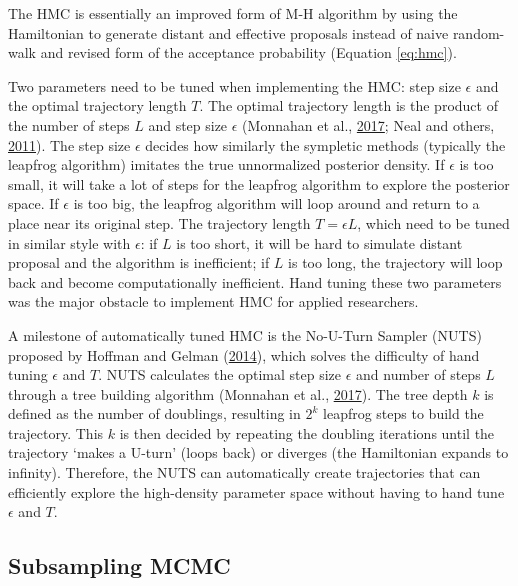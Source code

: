 \documentclass[12pt]{book}
\numberwithin{equation}{chapter}
\begin{document}
The HMC is essentially an improved form of M-H algorithm by using the Hamiltonian to generate distant and effective proposals instead of naive random-walk and revised form of the acceptance probability (Equation \eqref{eq:hmc}).

Two parameters need to be tuned when implementing the HMC: step size \(\epsilon\) and the optimal trajectory length \(T\). The optimal trajectory length is the product of the number of steps \(L\) and step size \(\epsilon\) (Monnahan et al., \protect\hyperlink{ref-monnahan2017faster}{2017}; Neal and others, \protect\hyperlink{ref-neal2011mcmc}{2011}). The step size \(\epsilon\) decides how similarly the sympletic methods (typically the leapfrog algorithm) imitates the true unnormalized posterior density. If \(\epsilon\) is too small, it will take a lot of steps for the leapfrog algorithm to explore the posterior space. If \(\epsilon\) is too big, the leapfrog algorithm will loop around and return to a place near its original step. The trajectory length \(T = \epsilon L\), which need to be tuned in similar style with \(\epsilon\): if \(L\) is too short, it will be hard to simulate distant proposal and the algorithm is inefficient; if \(L\) is too long, the trajectory will loop back and become computationally inefficient. Hand tuning these two parameters was the major obstacle to implement HMC for applied researchers.

A milestone of automatically tuned HMC is the No-U-Turn Sampler (NUTS) proposed by Hoffman and Gelman (\protect\hyperlink{ref-hoffman2014no}{2014}), which solves the difficulty of hand tuning \(\epsilon\) and \(T\). NUTS calculates the optimal step size \(\epsilon\) and number of steps \(L\) through a tree building algorithm (Monnahan et al., \protect\hyperlink{ref-monnahan2017faster}{2017}). The tree depth \(k\) is defined as the number of doublings, resulting in \(2^k\) leapfrog steps to build the trajectory. This \(k\) is then decided by repeating the doubling iterations until the trajectory `makes a U-turn' (loops back) or diverges (the Hamiltonian expands to infinity). Therefore, the NUTS can automatically create trajectories that can efficiently explore the high-density parameter space without having to hand tune \(\epsilon\) and \(T\).

\hypertarget{subsampling-mcmc}{%
\subsection{Subsampling MCMC}\label{subsampling-mcmc}}
\end{document}

